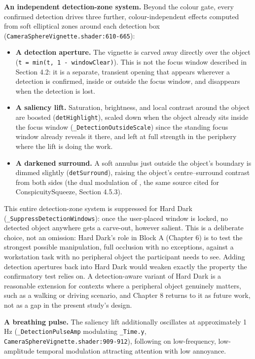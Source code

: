 \textbf{An independent detection-zone system.} Beyond the colour gate, every confirmed detection
drives three further, colour-independent effects computed from soft elliptical zones around each
detection box (\verb|CameraSphereVignette.shader:610-665|):

\begin{itemize}
\item \textbf{A detection aperture.} The vignette is carved away directly over the object
  (\verb|t = min(t, 1 - windowClear)|). This is not the focus window described in Section 4.2: it
  is a separate, transient opening that appears wherever a detection is confirmed, inside or
  outside the focus window, and disappears when the detection is lost.
\item \textbf{A saliency lift.} Saturation, brightness, and local contrast around the object are
  boosted (\verb|detHighlight|), scaled down when the object already sits inside the focus window
  (\verb|_DetectionOutsideScale|) since the standing focus window already reveals it there, and
  left at full strength in the periphery where the lift is doing the work.
\item \textbf{A darkened surround.} A soft annulus just outside the object's boundary is dimmed
  slightly (\verb|detSurround|), raising the object's centre–surround contrast from both sides
  (the dual modulation of \citealp{veas2011}, the same source cited for ConspicuitySqueeze,
  Section 4.5.3).
\end{itemize}

This entire detection-zone system is suppressed for Hard Dark (\verb|_SuppressDetectionWindows|):
once the user-placed window is locked, no detected object anywhere gets a carve-out, however
salient. This is a deliberate choice, not an omission: Hard Dark's role in Block A (Chapter 6) is to
test the strongest possible manipulation, full occlusion with no exceptions, against a workstation
task with no peripheral object the participant needs to see. Adding detection apertures back into
Hard Dark would weaken exactly the property the confirmatory test relies on. A detection-aware
variant of Hard Dark is a reasonable extension for contexts where a peripheral object genuinely
matters, such as a walking or driving scenario, and Chapter 8 returns to it as future work, not as a
gap in the present study's design.

\textbf{A breathing pulse.} The saliency lift additionally oscillates at approximately 1 Hz
(\verb|_DetectionPulseAmp| modulating \verb|_Time.y|, \verb|CameraSphereVignette.shader:909-912|),
following \citet{waldner2014} on low-frequency, low-amplitude temporal modulation
attracting attention with low annoyance.


